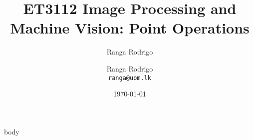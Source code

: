 \documentclass[aspectratio=169,xcolor={svgnames}, beamer, 10pt]{beamer}
\title{ET3112 Image Processing and Machine Vision: Point Operations}
\author{Ranga Rodrigo}
\author[]{Ranga Rodrigo\\ \texttt{ranga@uom.lk}}
\institute[]{The University of Moratuwa, Sri Lanka}
\date{\today}
\begin{document}
    \begin{frame}
        \titlepage
    \end{frame}


    {body}
\end{document}
